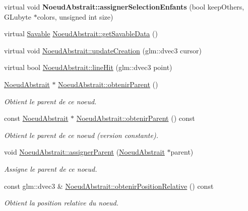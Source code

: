 \begin{DoxyCompactItemize}
\item 
\hypertarget{group__inf2990_ga30b0e5b609578bf879a59b71af5fa1ff}{virtual void {\bfseries Noeud\-Abstrait\-::assigner\-Selection\-Enfants} (bool keep\-Others, G\-Lubyte $\ast$colors, unsigned int size)}\label{group__inf2990_ga30b0e5b609578bf879a59b71af5fa1ff}

\item 
virtual \hyperlink{class_savable}{Savable} \hyperlink{group__inf2990_ga1729231ec41b3ba4d6668eba101ead44}{Noeud\-Abstrait\-::get\-Savable\-Data} ()
\item 
virtual void \hyperlink{group__inf2990_ga233fd4600812176c557bb94ea04da5c9}{Noeud\-Abstrait\-::update\-Creation} (glm\-::dvec3 cursor)
\item 
virtual bool \hyperlink{group__inf2990_gaf7c1f8526b0f7da001e9c3cb5e8e3540}{Noeud\-Abstrait\-::line\-Hit} (glm\-::dvec3 point)
\item 
\hyperlink{class_noeud_abstrait}{Noeud\-Abstrait} $\ast$ \hyperlink{group__inf2990_gaa2ac8c4cd02d88c312b92c65e07ed6d9}{Noeud\-Abstrait\-::obtenir\-Parent} ()
\begin{DoxyCompactList}\small\item\em Obtient le parent de ce noeud. \end{DoxyCompactList}\item 
const \hyperlink{class_noeud_abstrait}{Noeud\-Abstrait} $\ast$ \hyperlink{group__inf2990_gaf063d208bc4764b1fd2c4e76ec0469b9}{Noeud\-Abstrait\-::obtenir\-Parent} () const 
\begin{DoxyCompactList}\small\item\em Obtient le parent de ce noeud (version constante). \end{DoxyCompactList}\item 
void \hyperlink{group__inf2990_ga7787ab59ecc1e6119287459a7154f307}{Noeud\-Abstrait\-::assigner\-Parent} (\hyperlink{class_noeud_abstrait}{Noeud\-Abstrait} $\ast$parent)
\begin{DoxyCompactList}\small\item\em Assigne le parent de ce noeud. \end{DoxyCompactList}\item 
const glm\-::dvec3 \& \hyperlink{group__inf2990_ga62d73f67c3b33e2cb106630bd1736a58}{Noeud\-Abstrait\-::obtenir\-Position\-Relative} () const 
\begin{DoxyCompactList}\small\item\em Obtient la position relative du noeud. \end{DoxyCompactList}\item 

\end{DoxyCompactItemize}
